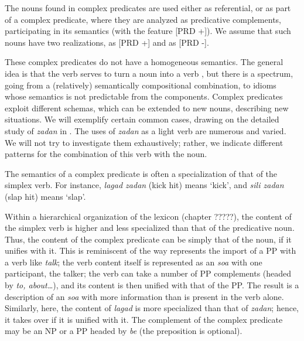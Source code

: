 \documentclass[output=paper
                ,modfonts
                ,nonflat
	        ,collection
	        ,collectionchapter
	        ,collectiontoclongg
 	        ,biblatex
                ,babelshorthands
                ,newtxmath
                ,draftmode
                ,colorlinks, citecolor=brown
]{./langsci/langscibook}
\begin{document}
{The nouns found in complex predicates are used either as referential, or as part of a complex predicate, where they are analyzed as predicative complements, participating in its semantics (with the feature [PRD +]). We assume that such nouns have two realizations, as [PRD +] and as [PRD -]. 

These complex predicates do not have a homogeneous semantics. The general idea is that the verb serves to turn a noun into a verb \citep{bonami2010persian}, but there is a spectrum, going from a (relatively) semantically compositional combination, to idioms whose semantics is not predictable from the components. Complex predicates exploit different schemas, which can be extended to new nouns, describing new situations. We will exemplify certain common cases, drawing on the detailed study of \emph{zadan} in \cite{pollet2012grammaire}. The uses of \emph{zadan} as a light verb are numerous and varied. We will not try to investigate them exhaustively; rather, we indicate different patterns for the combination of this verb with the noun. 

The semantics of a complex predicate is often a specialization of that of the simplex verb. For instance, \emph{lagad zadan} (kick hit) means `kick', and \emph{sili zadan} (slap hit) means `slap'. 

\z

Within a hierarchical organization of the lexicon (chapter ?????), the content of the simplex verb is higher and less specialized than that of the predicative noun. Thus, the content of the complex predicate can be simply that of the noun, if it unifies with it. This is reminiscent of the way \cite{Wechsler1995c} represents the import of a PP with a verb like \emph{talk}; the verb content itself is represented as an \emph{soa} with one participant, the talker; the verb can take a number of PP complements (headed by \emph{to, about…}), and its content is then unified with that of the PP. The result is a description of an \emph{soa} with more information than is present in the verb alone. Similarly, here, the content of \emph{lagad} is more specialized than that of \emph{zadan}; hence, it takes over if it is unified with it. The complement of the complex predicate may be an NP or a PP headed by \emph{be} (the preposition is optional). 

}
\end{document}
